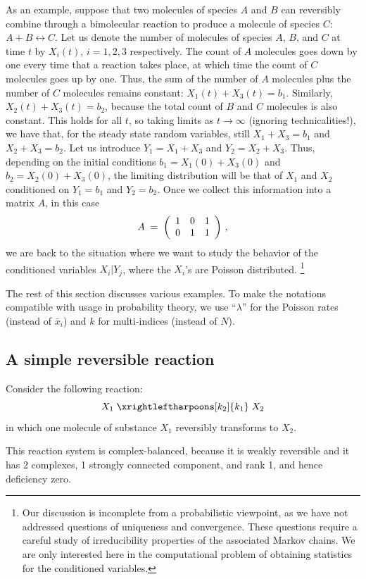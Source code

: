 \documentclass[11pt]{article}
\newcommand{\be}[1]{\begin{equation}\label{#1}}
\newcommand{\ee}{\end{equation}}
\newcommand{\mypmatrix}[1]{\left(\begin{array}{cccccccccccc}#1\end{array}\right)}
\newcommand{\arrowschem}[2]{\xrightleftharpoons[#1]{#2}}
\begin{document}
As an example, suppose that two molecules of species $A$ and $B$ can
reversibly combine through a bimolecular reaction to produce a molecule of
species $C$: $A+B \leftrightarrow C$.  Let us denote the number of molecules
of species $A$, $B$, and $C$ at time $t$ by $X_i(t)$, $i=1,2,3$ respectively.
The count of $A$ molecules goes down by one every time that a reaction takes
place, at which time the count of $C$ molecules goes up by one.  Thus, the sum
of the number of $A$ molecules plus the number of $C$ molecules remains
constant: $X_1(t)+X_3(t) = b_1$.  Similarly, $X_2(t)+X_3(t)=b_2$, because the
total count of $B$ and $C$ molecules is also constant.  
This holds for all $t$, so taking limits as $t\rightarrow \infty $ (ignoring
technicalities!{}), we have that, for the steady state random variables, still
$X_1+X_3 = b_1$ and $X_2+X_3=b_2$.
Let us introduce $Y_1=X_1+X_3$ and $Y_2=X_2+X_3$.
Thus, depending on the initial conditions $b_1=X_1(0)+X_3(0)$ and
$b_2=X_2(0)+X_3(0)$, the limiting distribution will be that of $X_1$ and
$X_2$ conditioned on $Y_1=b_1$ and $Y_2=b_2$.
Once we collect this information into a matrix $A$, in this case
\[
A \;=\; \mypmatrix{1 & 0 & 1\cr
                   0 & 1 & 1}\,,
\]
we are back to the situation where we want to study the behavior of
the conditioned variables $X_i|Y_j$, where the $X_i$'s are Poisson
distributed.%
\footnote{Our discussion is incomplete from a probabilistic viewpoint, as
we have not addressed questions of uniqueness and convergence.
These questions require a careful study of irreducibility properties of the 
associated Markov chains.
We are only interested here in the computational problem of obtaining
statistics for the conditioned variables.}

The rest of this section discusses various examples.
To make the notations compatible with usage in probability theory,
we use ``$\lambda $'' for the Poisson rates (instead of ${\bar x_i}$)
and $k$ for multi-indices (instead of $N$).

\subsection{A simple reversible reaction}

Consider the following reaction:
\be{eqn:1plus1}
X_1 \;\arrowschem{k_2}{k_1}\; X_2
\ee
in which one molecule of substance $X_1$ reversibly transforms to $X_2$.

This reaction system is complex-balanced, because it is weakly reversible and
it has 2 complexes, 1 strongly connected component, and rank 1, and hence
deficiency zero.
\end{document}
